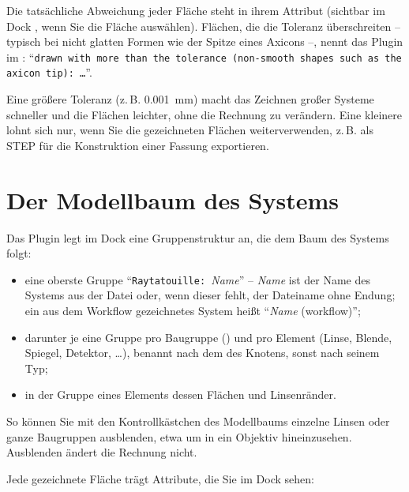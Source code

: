 Die tatsächliche Abweichung jeder Fläche steht in ihrem Attribut 
(sichtbar im Dock , wenn Sie die Fläche auswählen). Flächen, die die Toleranz
überschreiten -- typisch bei nicht glatten Formen wie der Spitze eines Axicons --, nennt das
Plugin im : \enquote{\texttt{drawn with more than the tolerance (non-smooth
shapes such as the axicon tip): …}}.

\begin{tipp}
Eine größere Toleranz (z.\,B. \SI{0.001}{\milli\metre}) macht das Zeichnen großer Systeme
schneller und die Flächen leichter, ohne die Rechnung zu verändern. Eine kleinere lohnt sich
nur, wenn Sie die gezeichneten Flächen weiterverwenden, z.\,B. als STEP für die Konstruktion einer
Fassung exportieren.
\end{tipp}

\section{Der Modellbaum des Systems}\label{sec:rt-modellbaum}

Das Plugin legt im Dock  eine Gruppenstruktur an, die dem Baum des Systems folgt:

\begin{itemize}
  \item eine oberste Gruppe \enquote{\texttt{Raytatouille: }\textit{Name}} -- \textit{Name} ist
    der Name des Systems aus der Datei oder, wenn dieser fehlt, der Dateiname ohne Endung; ein
    aus dem Workflow gezeichnetes System heißt \enquote{\textit{Name} (workflow)};
  \item darunter je eine Gruppe pro Baugruppe () und pro Element (Linse, Blende,
    Spiegel, Detektor, \dots), benannt nach dem  des Knotens, sonst nach seinem Typ;
  \item in der Gruppe eines Elements dessen Flächen und Linsenränder.
\end{itemize}

So können Sie mit den Kontrollkästchen des Modellbaums einzelne Linsen oder ganze Baugruppen
ausblenden, etwa um in ein Objektiv hineinzusehen. Ausblenden ändert die Rechnung nicht.

Jede gezeichnete Fläche trägt Attribute, die Sie im Dock  sehen:

